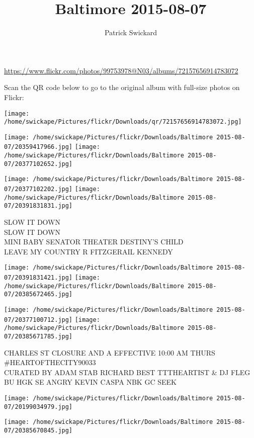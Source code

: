 \documentclass[10pt,letterpaper]{article}
\title{Baltimore 2015-08-07}
\author{Patrick Swickard}
\date{}
\begin{document}
\maketitle

\url{https://www.flickr.com/photos/99753978@N03/albums/72157656914783072}

Scan the QR code below to go to the original album with full-size photos on Flickr:

\texttt{[image: /home/swickape/Pictures/flickr/Downloads/qr/72157656914783072.jpg]}
\pagebreak

\texttt{[image: /home/swickape/Pictures/flickr/Downloads/Baltimore 2015-08-07/20359417966.jpg]}
\texttt{[image: /home/swickape/Pictures/flickr/Downloads/Baltimore 2015-08-07/20377102652.jpg]}

\texttt{[image: /home/swickape/Pictures/flickr/Downloads/Baltimore 2015-08-07/20377102202.jpg]}
\texttt{[image: /home/swickape/Pictures/flickr/Downloads/Baltimore 2015-08-07/20391831831.jpg]}

SLOW IT DOWN\\
SLOW IT DOWN\\
MINI BABY SENATOR THEATER DESTINY'S CHILD\\
LEAVE MY COUNTRY R FITZGERAIL KENNEDY
\pagebreak

\texttt{[image: /home/swickape/Pictures/flickr/Downloads/Baltimore 2015-08-07/20391831421.jpg]}
\texttt{[image: /home/swickape/Pictures/flickr/Downloads/Baltimore 2015-08-07/20385672465.jpg]}

\texttt{[image: /home/swickape/Pictures/flickr/Downloads/Baltimore 2015-08-07/20377100712.jpg]}
\texttt{[image: /home/swickape/Pictures/flickr/Downloads/Baltimore 2015-08-07/20385671785.jpg]}

CHARLES ST CLOSURE AND A EFFECTIVE 10:00 AM THURS\\
\#HEARTOFTHECITY90033\\
CURATED BY ADAM STAB RICHARD BEST TTTHEARTIST \& DJ FLEG\\
BU HGK SE ANGRY KEVIN CASPA NBK GC SEEK
\pagebreak

\texttt{[image: /home/swickape/Pictures/flickr/Downloads/Baltimore 2015-08-07/20199034979.jpg]}

\vspace{0.25in}
\texttt{[image: /home/swickape/Pictures/flickr/Downloads/Baltimore 2015-08-07/20385670845.jpg]}
\end{document}
